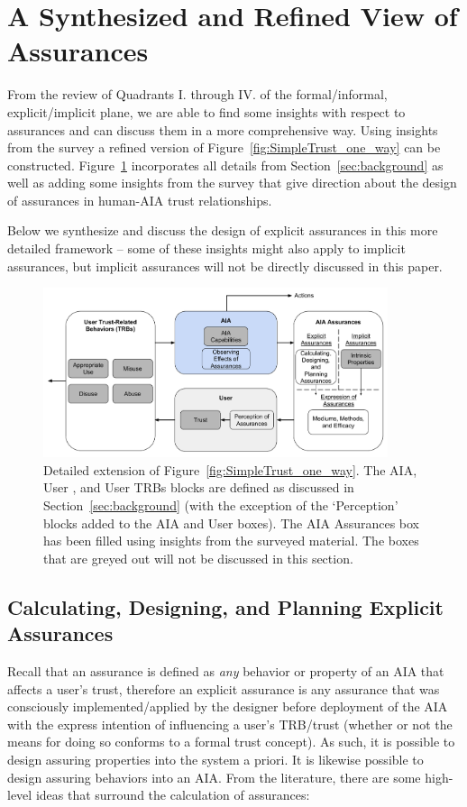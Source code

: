 \section{A Synthesized and Refined View of Assurances} \label{sec:synthesis}
    From the review of Quadrants I. through IV. of the formal/informal, explicit/implicit plane, we are able to find some insights with respect to assurances and can discuss them in a more comprehensive way. Using insights from the survey a refined version of Figure~\ref{fig:SimpleTrust_one_way} can be constructed. Figure~\ref{fig:refined_assurances} incorporates all details from Section~\ref{sec:background} as well as adding some insights from the survey that give direction about the design of assurances in human-AIA trust relationships. 
   
   Below we synthesize and discuss the design of explicit assurances in this more detailed framework -- some of these insights might also apply to implicit assurances, but implicit assurances will not be directly discussed in this paper.

    \begin{figure}[htbp]
        \centering
        \includegraphics[width=0.9\textwidth]{Figures/RefinedTrust_one_way}
        \caption{Detailed extension of Figure~\ref{fig:SimpleTrust_one_way}. The AIA, User , and User TRBs blocks are defined as discussed in Section~\ref{sec:background} (with the exception of the `Perception' blocks added to the AIA and User boxes). The AIA Assurances box has been filled using insights from the surveyed material. The boxes that are greyed out will not be discussed in this section.}
        \label{fig:refined_assurances}
    \end{figure}

\subsection{Calculating, Designing, and Planning Explicit Assurances}
    Recall that an assurance is defined as \emph{any} behavior or property of an AIA that affects a user's trust, therefore an explicit assurance is any assurance that was consciously implemented/applied by the designer before deployment of the AIA with the express intention of influencing a user's TRB/trust (whether or not the means for doing so conforms to a formal trust concept). As such, it is possible to design assuring properties into the system a priori. It is likewise possible to design assuring behaviors into an AIA. From the literature, there are some high-level ideas that surround the calculation of assurances: 

